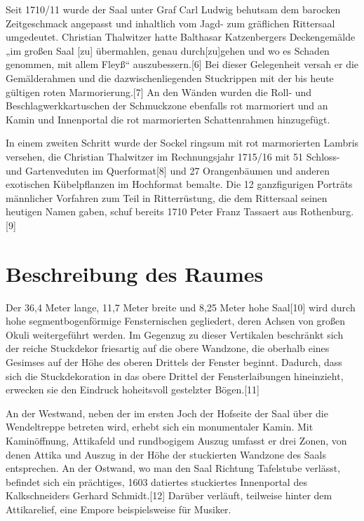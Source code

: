 \documentclass[
  a4paper,
  openany]{book}
\begin{document}
Seit 1710/11 wurde der Saal unter Graf Carl Ludwig behutsam dem barocken
Zeitgeschmack angepasst und inhaltlich vom Jagd- zum gräflichen
Rittersaal umgedeutet. Christian Thalwitzer hatte Balthasar
Katzenbergers Deckengemälde „im großen Saal {[}zu{]} übermahlen, genau
durch{[}zu{]}gehen und wo es Schaden genommen, mit allem Fleyß``
auszubessern.{[}6{]} Bei dieser Gelegenheit versah er die Gemälderahmen
und die dazwischenliegenden Stuckrippen mit der bis heute gültigen roten
Marmorierung.{[}7{]} An den Wänden wurden die Roll- und
Beschlagwerkkartuschen der Schmuckzone ebenfalls rot marmoriert und an
Kamin und Innenportal die rot marmorierten Schattenrahmen hinzugefügt.

In einem zweiten Schritt wurde der Sockel ringsum mit rot marmorierten
Lambris versehen, die Christian Thalwitzer im Rechnungsjahr 1715/16 mit
51 Schloss- und Gartenveduten im Querformat{[}8{]} und 27 Orangenbäumen
und anderen exotischen Kübelpflanzen im Hochformat bemalte. Die 12
ganzfigurigen Porträts männlicher Vorfahren zum Teil in Ritterrüstung,
die dem Rittersaal seinen heutigen Namen gaben, schuf bereits 1710 Peter
Franz Tassaert aus Rothenburg.{[}9{]}

\section{Beschreibung des Raumes}\label{beschreibung-des-raumes}

Der 36,4 Meter lange, 11,7 Meter breite und 8,25 Meter hohe Saal{[}10{]}
wird durch hohe segmentbogenförmige Fensternischen gegliedert, deren
Achsen von großen Okuli weitergeführt werden. Im Gegenzug zu dieser
Vertikalen beschränkt sich der reiche Stuckdekor friesartig auf die
obere Wandzone, die oberhalb eines Gesimses auf der Höhe des oberen
Drittels der Fenster beginnt. Dadurch, dass sich die Stuckdekoration in
das obere Drittel der Fensterlaibungen hineinzieht, erwecken sie den
Eindruck hoheitsvoll gestelzter Bögen.{[}11{]}

An der Westwand, neben der im ersten Joch der Hofseite der Saal über die
Wendeltreppe betreten wird, erhebt sich ein monumentaler Kamin. Mit
Kaminöffnung, Attikafeld und rundbogigem Auszug umfasst er drei Zonen,
von denen Attika und Auszug in der Höhe der stuckierten Wandzone des
Saals entsprechen. An der Ostwand, wo man den Saal Richtung Tafelstube
verlässt, befindet sich ein prächtiges, 1603 datiertes stuckiertes
Innenportal des Kalkschneiders Gerhard Schmidt.{[}12{]} Darüber
verläuft, teilweise hinter dem Attikarelief, eine Empore beispielsweise
für Musiker.
\end{document}
